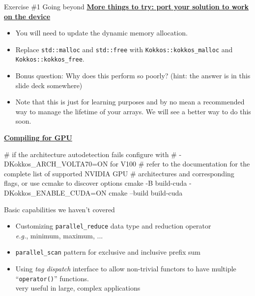
\iffull
\begin{frame}[fragile]{Exercise \#1 Going beyond}
   \ul{\textbf{More things to try: port your solution to work on the device}}
   \begin{itemize}
     \item You will need to update the dynamic memory allocation.
     \item Replace \texttt{std::malloc} and \texttt{std::free} with \texttt{Kokkos::kokkos\_malloc} and \texttt{Kokkos::kokkos\_free}.
     \item Bonus question:  Why does this perform so poorly?  (hint: the answer is in this slide deck somewhere)
     \item Note that this is just for learning purposes and by no mean a recommended way to manage the lifetime of your arrays.  We will see a better way to do this soon.
   \end{itemize}

   \ul{\textbf{Compiling for GPU}}
  \vspace{-3pt}
  \begin{small}
  \begin{code}
  # if the architecture autodetection fails configure with
  # -DKokkos_ARCH_VOLTA70=ON for V100
  # refer to the documentation for the complete list of supported NVIDIA GPU
  # architectures and corresponding flags, or use ccmake to discover options
    cmake -B build-cuda -DKokkos_ENABLE_CUDA=ON
    cmake --build build-cuda
  \end{code}
  \end{small}
\end{frame}
\fi


\iffull
\begin{frame}[fragile]{Basic capabilities we haven't covered}

  \begin{itemize}

  \item {Customizing \texttt{parallel\_reduce} data type and reduction operator
    \\ \hspace{10pt} \emph{e.g.}, minimum, maximum, ...}

  \item {\texttt{parallel\_scan} pattern for exclusive and inclusive prefix sum}

  \item {Using \textit{tag dispatch} interface to allow non-trivial functors to have multiple ``\texttt{operator()}'' functions.
    \\ \hspace{10pt} very useful in large, complex applications}

  \end{itemize}

\end{frame}
\fi

